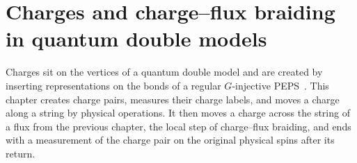 \chapter{Charges and charge--flux braiding in quantum double models}
\label{ch:peps_anyons}

Charges sit on the vertices of a quantum double model and are created by
inserting representations on the bonds of a regular $G$-injective
PEPS~\cite[Section~III.B]{Cirac2021Matrix}. This chapter creates charge pairs,
measures their charge labels, and moves a charge along a string by physical
operations. It then moves a charge across the string of a flux from the
previous chapter, the local step of charge--flux braiding, and ends with a
measurement of the charge pair on the original physical spins after its return.


